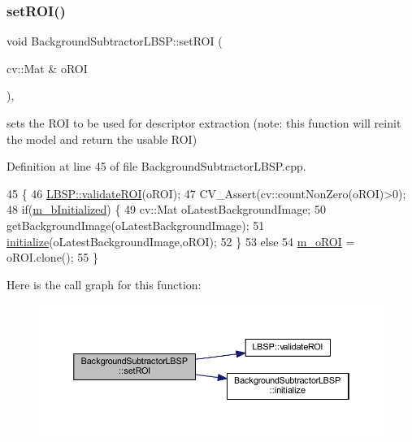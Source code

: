 \subsubsection{\texorpdfstring{set\+R\+O\+I()}{setROI()}}
{\footnotesize\ttfamily void Background\+Subtractor\+L\+B\+S\+P\+::set\+R\+OI (\begin{DoxyParamCaption}\item[{cv\+::\+Mat \&}]{o\+R\+OI }\end{DoxyParamCaption})\hspace{0.3cm}{\ttfamily [virtual]}, {\ttfamily [inherited]}}



sets the R\+OI to be used for descriptor extraction (note\+: this function will reinit the model and return the usable R\+OI) 



Definition at line 45 of file Background\+Subtractor\+L\+B\+S\+P.\+cpp.


\begin{DoxyCode}
45                                                  \{
46     \mbox{\hyperlink{class_l_b_s_p_ad97557be4bc6cfd7b0fa4b01ab8f8c55}{LBSP::validateROI}}(oROI);
47     CV\_Assert(cv::countNonZero(oROI)>0);
48     \textcolor{keywordflow}{if}(\mbox{\hyperlink{class_background_subtractor_l_b_s_p_a55cea104a0924fd50d5bed0912828a7e}{m\_bInitialized}}) \{
49         cv::Mat oLatestBackgroundImage;
50         getBackgroundImage(oLatestBackgroundImage);
51         \mbox{\hyperlink{class_background_subtractor_l_b_s_p_ac6b854f94414497b143375d4a0ae8b6f}{initialize}}(oLatestBackgroundImage,oROI);
52     \}
53     \textcolor{keywordflow}{else}
54         \mbox{\hyperlink{class_background_subtractor_l_b_s_p_a53fe98bd2489d95de5292467145901e9}{m\_oROI}} = oROI.clone();
55 \}
\end{DoxyCode}
Here is the call graph for this function\+:
\nopagebreak
\begin{figure}[H]
\begin{center}
\leavevmode
\includegraphics[width=350pt]{class_background_subtractor_l_b_s_p_a34dc38d3d925d46d289c750786f232dc_cgraph}
\end{center}
\end{figure}


